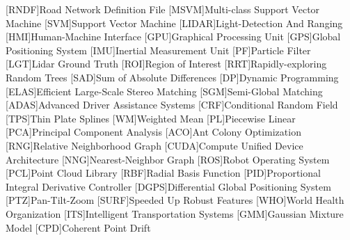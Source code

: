 [RNDF]{Road Network Definition File}
[MSVM]{Multi-class Support Vector Machine}
[SVM]{Support Vector Machine}
[LIDAR]{Light-Detection And Ranging}
[HMI]{Human-Machine Interface}
[GPU]{Graphical Processing Unit}
[GPS]{Global Positioning System}
[IMU]{Inertial Measurement Unit}
[PF]{Particle Filter}
[LGT]{Lidar Ground Truth}
[ROI]{Region of Interest}
[RRT]{Rapidly-exploring Random Trees}
[SAD]{Sum of Absolute Differences}
[DP]{Dynamic Programming}
[ELAS]{Efficient Large-Scale Stereo Matching}
[SGM]{Semi-Global Matching}
[ADAS]{Advanced Driver Assistance Systems}
[CRF]{Conditional Random Field}
[TPS]{Thin Plate Splines}
[WM]{Weighted Mean}
[PL]{Piecewise Linear}
[PCA]{Principal Component Analysis}
[ACO]{Ant Colony Optimization}
[RNG]{Relative Neighborhood Graph}
[CUDA]{Compute Unified Device Architecture}
[NNG]{Nearest-Neighbor Graph}
[ROS]{Robot Operating System}
[PCL]{Point Cloud Library}
[RBF]{Radial Basis Function}
[PID]{Proportional Integral Derivative Controller}
[DGPS]{Differential Global Positioning System}
[PTZ]{Pan-Tilt-Zoom}
[SURF]{Speeded Up Robust Features}
[WHO]{World Health Organization}
[ITS]{Intelligent Transportation Systems}
[GMM]{Gaussian Mixture Model}
[CPD]{Coherent Point Drift}


